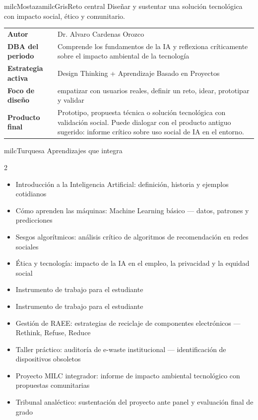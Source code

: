 \documentclass[11pt,letterpaper]{article}
\begin{document}
\begin{softbox}{milcMostaza}{milcGris}{Reto central}
Diseñar y sustentar una solución tecnológica con impacto social, ético y comunitario.
\end{softbox}

\begin{tabularx}{\textwidth}{>{\bfseries}p{3.4cm}X}
\rowcolor{milcMagenta!12}Autor & Dr. Alvaro Cardenas Orozco\\
DBA del periodo & Comprende los fundamentos de la IA y reflexiona críticamente sobre el impacto ambiental de la tecnología\\
Estrategia activa & Design Thinking + Aprendizaje Basado en Proyectos\\
Foco de diseño & empatizar con usuarios reales, definir un reto, idear, prototipar y validar\\
Producto final & Prototipo, propuesta técnica o solución tecnológica con validación social. Puede dialogar con el producto antiguo sugerido: informe crítico sobre uso social de IA en el entorno.\\
\end{tabularx}

\begin{titlebox}{milcTurquesa}
Aprendizajes que integra
\end{titlebox}
\begin{multicols}{2}
\begin{itemize}[leftmargin=*]
\item Introducción a la Inteligencia Artificial: definición, historia y ejemplos cotidianos
\item Cómo aprenden las máquinas: Machine Learning básico — datos, patrones y predicciones
\item Sesgos algorítmicos: análisis crítico de algoritmos de recomendación en redes sociales
\item Ética y tecnología: impacto de la IA en el empleo, la privacidad y la equidad social
\item Instrumento de trabajo para el estudiante
\item Instrumento de trabajo para el estudiante
\item Gestión de RAEE: estrategias de reciclaje de componentes electrónicos — Rethink, Refuse, Reduce
\item Taller práctico: auditoría de e-waste institucional — identificación de dispositivos obsoletos
\item Proyecto MILC integrador: informe de impacto ambiental tecnológico con propuestas comunitarias
\item Tribunal analéctico: sustentación del proyecto ante panel y evaluación final de grado
\end{itemize}
\end{multicols}
\end{document}
